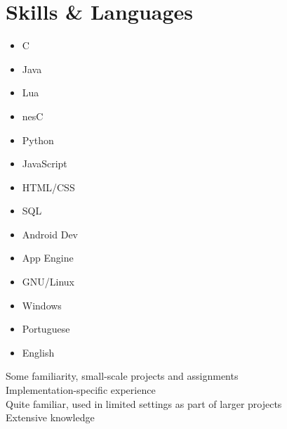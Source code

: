 \documentclass[a4paper,10pt]{article}
\begin{document}
\section{Skills \& Languages}
\begin{multicols}{3}
  \begin{itemize}
    \renewcommand{\labelitemi}{\textcolor{lightg}{\symbol{"00BB}}}
    \setlength{\itemsep}{1pt}
    \setlength{\parskip}{0pt}
    \setlength{\parsep}{0pt}
  \item C \hfill \threenotes 
  \item Java \hfill \threenotes
  \item Lua \hfill \threenotes
  \item nesC \hfill \twonotes
  \item Python \hfill \twonotes
  \item JavaScript \hfill \twonotes
  \item HTML/CSS \hfill \threenotes
  \item SQL \hfill \twonotes
  \item Android Dev \hfill \threenotes
  \item App Engine \hfill \twonotes
  \item GNU/Linux \hfill \threenotes
  \item Windows \hfill \threenotes
  \item Portuguese \hfill \fournotes
  \item English \hfill \threenotes
  \end{itemize} 
\end{multicols}

\vspace{1em}

\begin{center}
  \parbox{12cm}{
    \onenote Some familiarity, small-scale projects and assignments \\
    \twonotes Implementation-specific experience \\
    \threenotes Quite familiar, used in limited settings as part of larger projects \\
    \fournotes Extensive knowledge
  }
\end{center}
\end{document}
